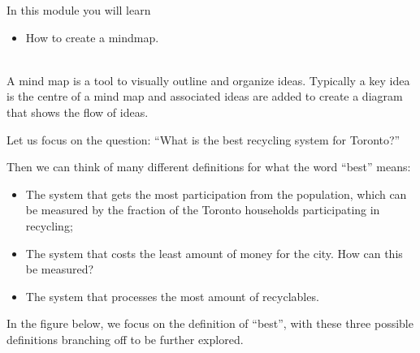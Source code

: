 \begin{siam}
	
	In this module you will learn
	\begin{itemize}
		\item How to create a mindmap.
	\end{itemize}


\hfill \\




A mind map is a tool to visually outline and organize ideas. Typically a key idea is the centre of a mind map and associated ideas are added to create a diagram that shows the flow of ideas. 

\begin{example}\label{ex-recycling}

Let us focus on the question: ``What is the best recycling system for Toronto?''

Then we can think of many different definitions for what the word ``best'' means:

\begin{itemize}
	\item The system that gets the most participation from the population, which can be measured by the fraction of the Toronto households participating in recycling;
	\item The system that costs the least amount of money for the city. How can this be measured?
	\item The system that processes the most amount of recyclables.
\end{itemize}

In the figure below, we focus on the definition of ``best'', with these three possible definitions branching off to be further explored.

\def\MindMapOne{
	\fill[color=lime] (0,0) rectangle (4,1) node[pos=.5] {\color{black}``Best'' recycling centre};
	\fill[color=BurntOrange] (6,2.5) rectangle (8,1.5) node[pos=.5] {\color{black}\begin{minipage}{40pt}\raggedright Most participation\end{minipage}};
	\fill[color=Goldenrod] (6,0) rectangle (8,1) node[pos=.5] {\color{black}\begin{minipage}{45pt}\raggedright Least cost to the city\end{minipage}};
	\fill[color=red!70!white] (6,-2) rectangle (8,-0.5) node[pos=.5] {\color{black}\begin{minipage}{50pt}\raggedright Processes the most recyclables\end{minipage}};
	\draw (4,0.75) -- (6,2);
	\draw (4,0.5) -- (6,0.5);
	\draw (4,0.25) -- (6,-1.25);
%
}


\end{example}
\end{siam}
